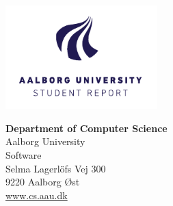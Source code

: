 {}
\thispagestyle{empty}


\begin{minipage}[t]{0.48\textwidth}
\vspace*{-25pt}
\includegraphics[height=4cm]{graphics/AAU-logo-stud-UK-RGB} 
\end{minipage}
\hfill
\begin{minipage}[t]{0.48\textwidth}
{\small 
\textbf{Department of Computer Science}\\
Aalborg University  \\
Software \\
Selma Lagerl\"{o}fs Vej 300 \\
9220 Aalborg Øst} \\
\url{www.cs.aau.dk}
\end{minipage}

\vspace*{1cm}

